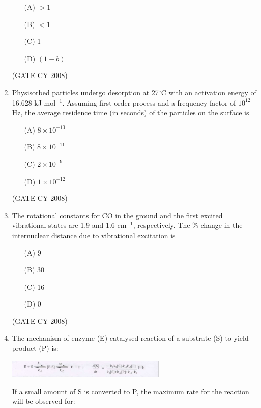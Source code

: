 \documentclass[12pt]{article}
\begin{document}
\begin{enumerate}
\begin{enumerate}
\item[(A)] $> 1$
\item[(B)] $< 1$
\item[(C)] 1
\item[(D)] $(1 - b)$
\end{enumerate}    \hfill{(GATE CY 2008)}




\item Physisorbed particles undergo desorption at 27$^\circ$C with an activation energy of 16.628 kJ mol$^{-1}$. Assuming first-order process and a frequency factor of $10^{12}$ Hz, the average residence time (in seconds) of the particles on the surface is

\begin{enumerate}
\item[(A)] $8 \times 10^{-10}$
\item[(B)] $8 \times 10^{-11}$
\item[(C)] $2 \times 10^{-9}$
\item[(D)] $1 \times 10^{-12}$
\end{enumerate}    \hfill{(GATE CY 2008)}




\item The rotational constants for CO in the ground and the first excited vibrational states are 1.9 and 1.6 cm$^{-1}$, respectively. The \% change in the internuclear distance due to vibrational excitation is

\begin{enumerate}
\item[(A)] 9
\item[(B)] 30
\item[(C)] 16
\item[(D)] 0
\end{enumerate}    \hfill{(GATE CY 2008)}




\item
The mechanism of enzyme (E) catalysed reaction of a substrate (S) to yield product (P) is:

\begin{center}
\includegraphics[width=0.6\textwidth]{figs/q69.png}
\end{center}

If a small amount of S is converted to P, the maximum rate for the reaction will be observed for:


\end{enumerate}
\end{document}
